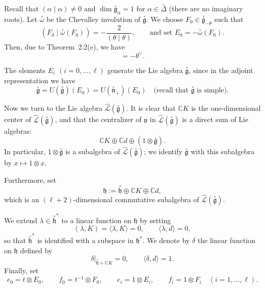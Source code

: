 \documentclass[12pt]{article}
\begin{document}
Recall that $(\alpha\mid\alpha) \neq 0$ and 
$\dim \overset{\circ}{\mathfrak{g}}_\alpha = 1$ for $\alpha \in \overset{\circ}{\Delta}$ 
(there are no imaginary roots).
Let $\overset{\circ}{\omega}$ be the Chevalley involution of $\overset{\circ}{\mathfrak{g}}$.
We choose $F_0 \in \overset{\circ}{\mathfrak{g}}_{-\theta}$ such that
\[
(F_0 \mid \overset{\circ}{\omega}(F_0)) = -\frac{2}{(\theta\mid\theta)},
\qquad\text{and set } E_0 = -\overset{\circ}{\omega}(F_0).
\]
Then, due to Theorem~2.2(e), we have
\begin{equation}
[E_0, F_0] = -\theta^\vee.
\tag{7.4.1}
\end{equation}

The elements $E_i$ $(i = 0, \dots, \ell)$ generate the Lie algebra $\overset{\circ}{\mathfrak{g}}$, since in the adjoint representation we have
\[
\overset{\circ}{\mathfrak{g}} = U(\overset{\circ}{\mathfrak{g}})(E_0)
= U(\overset{\circ}{\mathfrak{n}}_+)(E_0)
\quad\text{(recall that $\overset{\circ}{\mathfrak{g}}$ is simple).}
\]

\medskip

Now we turn to the Lie algebra $\widehat{\mathcal{L}}(\overset{\circ}{\mathfrak{g}})$.
It is clear that $\mathbb{C}K$ is the one-dimensional center of $\widehat{\mathcal{L}}(\overset{\circ}{\mathfrak{g}})$,
and that the centralizer of $\mathfrak{v}$ in 
$\widehat{\mathcal{L}}(\overset{\circ}{\mathfrak{g}})$
is a direct sum of Lie algebras:
\[
\mathbb{C}K \oplus \mathbb{C}d \oplus (1 \otimes \overset{\circ}{\mathfrak{g}}).
\]
In particular, $1 \otimes \overset{\circ}{\mathfrak{g}}$ is a subalgebra of 
$\widehat{\mathcal{L}}(\overset{\circ}{\mathfrak{g}})$; we identify 
$\overset{\circ}{\mathfrak{g}}$ with this subalgebra by $x \mapsto 1 \otimes x$.

\medskip

Furthermore, set
\[
\mathfrak{h} := \overset{\circ}{\mathfrak{h}} \oplus \mathbb{C}K \oplus \mathbb{C}d,
\]
which is an $(\ell+2)$-dimensional commutative subalgebra of 
$\widehat{\mathcal{L}}(\overset{\circ}{\mathfrak{g}})$.

We extend $\lambda \in \overset{\circ}{\mathfrak{h}}^*$ to a linear function on $\mathfrak{h}$
by setting
\[
(\lambda, K) = \langle \lambda, K \rangle = 0,
\qquad
\langle \lambda, d \rangle = 0,
\]
so that $\overset{\circ}{\mathfrak{h}}^*$ is identified with a subspace in $\mathfrak{h}^*$.
We denote by $\delta$ the linear function on $\mathfrak{h}$ defined by
\[
\delta|_{\overset{\circ}{\mathfrak{h}} + \mathbb{C}K} = 0,
\qquad
\langle \delta, d \rangle = 1.
\]
Finally, set
\[
e_0 = t \otimes E_0, \qquad
f_0 = t^{-1} \otimes F_0, \qquad
e_i = 1 \otimes E_i, \qquad
f_i = 1 \otimes F_i \quad (i = 1, \dots, \ell).
\]
\end{document}
